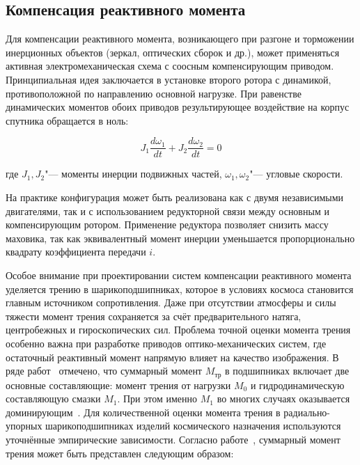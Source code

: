 \subsection{Компенсация реактивного момента}

Для компенсации реактивного момента, возникающего при разгоне и торможении инерционных объектов (зеркал, оптических сборок и др.), может применяться активная электромеханическая схема с соосным компенсирующим приводом. Принципиальная идея заключается в установке второго ротора с динамикой, противоположной по направлению основной нагрузке. При равенстве динамических моментов обоих приводов результирующее воздействие на корпус спутника обращается в ноль:

\begin{equation}
	\label{eq:equal_inertia}
	J_1\frac{d\omega_1}{dt}+J_2\frac{d\omega_2}{dt} = 0
\end{equation}

где \(J_1,J_2\)"--- моменты инерции подвижных частей, \(\omega_1,\omega_2\)"--- угловые скорости.

На практике конфигурация может быть реализована как с двумя независимыми двигателями, так и с использованием редукторной связи между основным и компенсирующим ротором. Применение редуктора позволяет снизить массу маховика, так как эквивалентный момент инерции уменьшается пропорционально квадрату коэффициента передачи $i$.

Особое внимание при проектировании систем компенсации реактивного момента уделяется трению в шарикоподшипниках, которое в условиях космоса становится главным источником сопротивления. Даже при отсутствии атмосферы и силы тяжести момент трения сохраняется за счёт предварительного натяга, центробежных и гироскопических сил. Проблема точной оценки момента трения особенно важна при разработке приводов оптико-механических систем, где остаточный реактивный момент напрямую влияет на качество изображения. В ряде работ~\cite{Babaeva1962, Delektorskii1968, Shashanov1971,Yavlensky1981} отмечено, что суммарный момент $M_{\text{тр}}$ в подшипниках включает две основные составляющие: момент трения от нагрузки $M_0$ и гидродинамическую составляющую смазки $M_1$. При этом именно $M_1$ во многих случаях оказывается доминирующим~\cite{Mikhailov2014}. Для количественной оценки момента трения в радиально-упорных шарикоподшипниках изделий космического назначения используются уточнённые эмпирические зависимости. Согласно работе~\cite{Delektorskii1968}, суммарный момент трения может быть представлен следующим образом:

